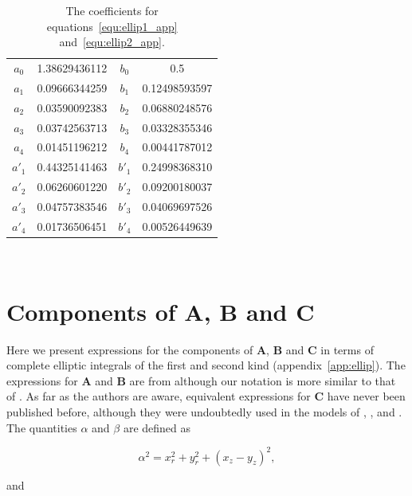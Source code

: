\documentclass[12pt]{article}
\begin{document}
\begin{table}
\caption{\label{tab:ellip_poly_coeff} The coefficients for equations~\ref{equ:ellip1_app} and~\ref{equ:ellip2_app}.}
\begin{center}
\begin{tabular}{|c|c|c|c|}
\hline
$a_{0}$ & 1.38629436112 & $b_{0}$ & 0.5 \\
$a_{1}$ & 0.09666344259 & $b_{1}$ & 0.12498593597 \\
$a_{2}$ & 0.03590092383 & $b_{2}$ & 0.06880248576 \\
$a_{3}$ & 0.03742563713 & $b_{3}$ & 0.03328355346 \\
$a_{4}$ & 0.01451196212 & $b_{4}$ & 0.00441787012 \\
\hline
$a'_{1}$ & 0.44325141463 & $b'_{1}$ & 0.24998368310 \\
$a'_{2}$ & 0.06260601220 & $b'_{2}$ & 0.09200180037 \\
$a'_{3}$ & 0.04757383546 & $b'_{3}$ & 0.04069697526 \\
$a'_{4}$ & 0.01736506451 & $b'_{4}$ & 0.00526449639 \\
\hline
\end{tabular}
\end{center} 
\end{table}

\section{Components of $\boldsymbol{A}$, $\boldsymbol{B}$ and $\boldsymbol{C}$}
\label{app:mat_A}

Here we present expressions for the components of $\boldsymbol{A}$, $\boldsymbol{B}$ and $\boldsymbol{C}$ in terms of complete elliptic integrals of the first and second kind (appendix~\ref{app:ellip}). The expressions for $\boldsymbol{A}$ and $\boldsymbol{B}$ are from \citet{Graziani89} although our notation is more similar to that of \citet{Manga94}. As far as the authors are aware, equivalent expressions for $\boldsymbol{C}$ have never been published before, although they were undoubtedly used in the models of \citet{Lee82}, \citet{Geller86}, \citet{Manga95} and \citet{Roumeliotis00}. The quantities $\alpha$ and $\beta$ are defined as \citep{Manga94}

\begin{equation}
\label{equ:alpha_def}
\alpha^{2} = x_{r}^{2} + y_{r}^{2} + (x_{z} - y_{z})^{2},
\end{equation}

and 
\end{document}
